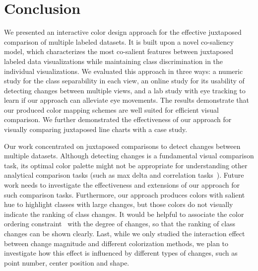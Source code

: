 \section {Conclusion}
We presented an interactive color design approach for the effective juxtaposed comparison of multiple labeled datasets.
It is built upon a novel co-saliency model, which characterizes the most co-salient features between juxtaposed labeled data visualizations while maintaining class discrimination in the individual visualizations.
We evaluated this approach in three ways: a numeric study for the class separability in each view,  an online study for its usability of detecting changes between multiple views, and a lab study with eye tracking to learn if our approach can alleviate eye movements. The results demonstrate that our produced color mapping schemes are well suited for efficient visual comparison. We further demonstrated the effectiveness of our approach for visually comparing juxtaposed line charts with a case study.


Our work concentrated on juxtaposed comparisons to detect changes between multiple datasets.
Although detecting changes is a fundamental visual comparison task, its optimal color palette might not be appropriate for understanding other analytical comparison tasks (such as max delta and correlation tasks~\cite{Ondov19}). Future work needs to investigate the effectiveness and extensions of our approach for such comparison tasks. Furthermore, our approach produces colors with salient hue to highlight classes with large changes, but those colors do not visually indicate the ranking of class changes.
It would be helpful to associate the color ordering constraint~\cite{Bujack18} with the degree of changes, so that the ranking of class changes can be  shown clearly.
Last, while we only studied the interaction effect between change magnitude and different colorization methods, we plan to investigate how this effect is influenced by different types of changes, such as point number, center position and shape.
